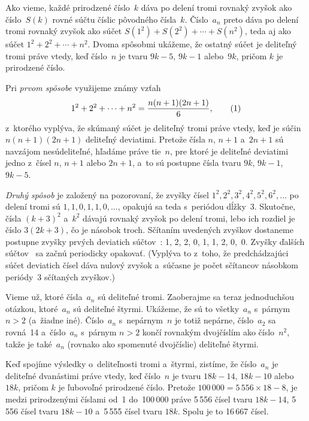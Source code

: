 {%
Ako vieme, každé prirodzené číslo~$k$ dáva po delení
tromi rovnaký zvyšok ako číslo~$S(k)$ rovné súčtu číslic
pôvodného čísla~$k$.
Číslo~$a_n$ preto dáva po delení tromi rovnaký zvyšok ako
súčet $S(1^2)+S(2^2)+\cdots+S(n^2)$, teda aj ako súčet
$1^2+2^2+\cdots+n^2$. Dvoma spôsobmi ukážeme, že ostatný súčet
je deliteľný tromi práve vtedy, keď číslo~$n$ je tvaru $9k-5$, $9k-1$
alebo~$9k$, pričom $k$ je prirodzené číslo.

\smallskip
Pri {\it prvom spôsobe\/} využijeme známy vzťah
$$
1^2+2^2+\cdots+n^2=\dfrac{n(n+1)(2n+1)}{6},
\tag1
$$
z~ktorého vyplýva, že skúmaný súčet je deliteľný tromi práve vtedy, keď
je súčin $n(n+1)(2n+1)$ deliteľný deviatimi. Pretože čísla $n$,
$n+1$ a~$2n+1$ sú navzájom nesúdeliteľné, hľadáme práve tie~$n$,
pre ktoré je deliteľné deviatimi jedno z~čísel $n$, $n+1$ alebo
$2n+1$, a~to sú postupne čísla tvaru $9k$, $9k-1$, $9k-5$.

 \smallskip
{\it Druhý spôsob\/} je založený na pozorovaní, že zvyšky čísel
$1^2, 2^2, 3^2, 4^2, 5^2,6^2,\dots$ po delení tromi sú
$1, 1, 0, 1, 1, 0, \dots$, opakujú sa teda s~periódou dĺžky~3.
Skutočne, čísla $(k+3)^2$ a~$k^2$ dávajú rovnaký zvyšok po delení
tromi, lebo ich rozdiel je číslo $3(2k+3)$, čo je násobok
troch. Sčítaním uvedených zvyškov dostaneme postupne zvyšky prvých
deviatich súčtov~: 1, 2, 2, 0, 1, 1, 2, 0,~0. Zvyšky ďalších
súčtov~ sa začnú periodicky opakovať. (Vyplýva to z~toho,
že predchádzajúci súčet deviatich čísel dáva nulový zvyšok a~súčasne je
počet sčítancov násobkom periódy~3 sčítaných zvyškov.)

Vieme už, ktoré čísla~$a_n$ sú deliteľné tromi. Zaoberajme sa teraz
jednoduchšou otázkou, ktoré~$a_n$ sú deliteľné štyrmi. Ukážeme, že sú to
všetky~$a_n$ s~párnym $n>2$ (a~žiadne iné). Číslo~$a_n$ 
s~nepárnym~$n$ je totiž nepárne, číslo~$a_2$ sa rovná~14 a~číslo~$a_n$
s~párnym $n>2$ končí rovnakým dvojčíslím ako číslo~$n^2$, takže je
také~$a_n$ (rovnako ako spomenuté dvojčíslie) deliteľné štyrmi.

Keď spojíme výsledky o~deliteľnosti tromi a~štyrmi,
zistíme, že číslo~$a_n$ je deliteľné dvanástimi práve vtedy,
keď číslo~$n$ je tvaru $18k-14$, $18k-10$ alebo $18k$,
pričom $k$ je ľubovoľné prirodzené číslo. Pretože
$100\,000=5\,556\times18-8$, je medzi prirodzenými číslami od~1
do~100\,000 práve 5\,556 čísel tvaru $18k-14$, 5\,556 čísel tvaru $18k-10$
a~5\,555 čísel tvaru $18k$. Spolu je to 16\,667 čísel.}

